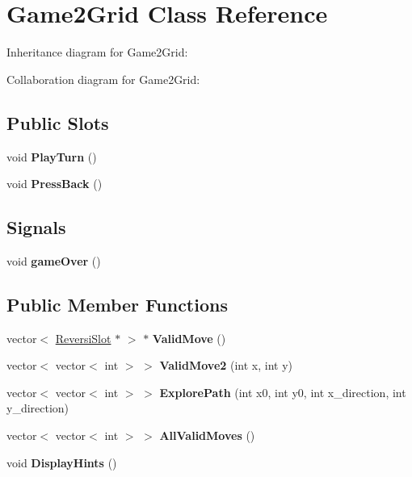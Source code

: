 \hypertarget{classGame2Grid}{}\section{Game2\+Grid Class Reference}
\label{classGame2Grid}


Inheritance diagram for Game2\+Grid\+:


Collaboration diagram for Game2\+Grid\+:
\subsection*{Public Slots}
\begin{DoxyCompactItemize}
\item 
\mbox{\label{classGame2Grid_a0b6b7e172797f39841d9cff2964777fa}} 
void {\bfseries Play\+Turn} ()
\item 
\mbox{\label{classGame2Grid_afa62f8ea4795c6826402c53110c6ba49}} 
void {\bfseries Press\+Back} ()
\end{DoxyCompactItemize}
\subsection*{Signals}
\begin{DoxyCompactItemize}
\item 
\mbox{\label{classGame2Grid_a33f724e897b96d77eebca3525ac4e095}} 
void {\bfseries game\+Over} ()
\end{DoxyCompactItemize}
\subsection*{Public Member Functions}
\begin{DoxyCompactItemize}
\item 
\mbox{\label{classGame2Grid_aff4e9b655a9de809997067e8228af113}} 
vector$<$ \hyperlink{classReversiSlot}{Reversi\+Slot} $\ast$ $>$ $\ast$ {\bfseries Valid\+Move} ()
\item 
\mbox{\label{classGame2Grid_adea02d06de5463b4edefe74a06c95fde}} 
vector$<$ vector$<$ int $>$ $>$ {\bfseries Valid\+Move2} (int x, int y)
\item 
\mbox{\label{classGame2Grid_a530992f6eaed3c76ad923305cd7ae86a}} 
vector$<$ vector$<$ int $>$ $>$ {\bfseries Explore\+Path} (int x0, int y0, int x\+\_\+direction, int y\+\_\+direction)
\item 
\mbox{\label{classGame2Grid_aab66dd4b9d00c82f692cfaa6a8642815}} 
vector$<$ vector$<$ int $>$ $>$ {\bfseries All\+Valid\+Moves} ()
\item 
\mbox{\label{classGame2Grid_ada03248484356844d9be9b5396cd8d69}} 
void {\bfseries Display\+Hints} ()
\end{DoxyCompactItemize}
